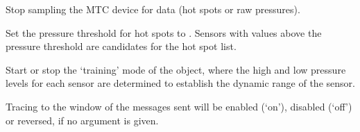   Stop sampling the MTC device for data (hot spots or raw pressures).
  
  Set the pressure threshold for hot spots to .
  Sensors with values above the pressure threshold are candidates for the hot spot list.

  Start or stop the `training' mode of the  object, where the high and low pressure levels for each sensor are
  determined to establish the dynamic range of the sensor.

  Tracing to the \MaxName{} window of the messages sent will be enabled (`on'), disabled (`off') or reversed, if no argument is given.
  
  \objListCmdEnd

\objItemFile

\objItemMessage



%

